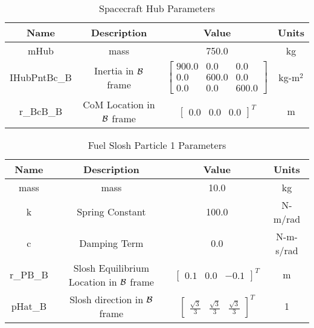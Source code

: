 \begin{table}[htbp]
	\caption{Spacecraft Hub Parameters}
	\label{tab:hub}
	\centering \fontsize{10}{10}\selectfont
	\begin{tabular}{| c | c | c | c |} %
		\hline
		\textbf{Name}  & \textbf{Description}  & \textbf{Value} & \textbf{Units} \\
		\hline
		mHub  & mass & 750.0 & kg \\
		\hline
		IHubPntBc\_B & Inertia in $\cal{B}$ frame & $\begin{bmatrix}
		900.0 & 0.0 & 0.0\\
		0.0 & 600.0 & 0.0\\
		0.0 & 0.0 & 600.0
		\end{bmatrix}$ & kg-m$^2$ \\
		\hline
		r\_BcB\_B & CoM Location in $\cal{B}$ frame & $\begin{bmatrix}
		0.0 & 0.0 & 0.0 \end{bmatrix}^T$ & m \\
		\hline
	\end{tabular}
\end{table}

\begin{table}[htbp]
	\caption{Fuel Slosh Particle 1 Parameters}
	\label{tab:slosh1}
	\centering \fontsize{10}{10}\selectfont
	\begin{tabular}{| c | c | c | c |} %
		\hline
		\textbf{Name}  & \textbf{Description}  & \textbf{Value} & \textbf{Units} \\
		\hline
		mass  & mass & 10.0 & kg \\
		\hline
		k & Spring Constant & 100.0 & N-m/rad \\
		\hline
		c & Damping Term & 0.0 & N-m-s/rad \\
		\hline
		r\_PB\_B & Slosh Equilibrium Location in $\cal{B}$ frame & $\begin{bmatrix}
		0.1 & 0.0 & -0.1 \end{bmatrix}^T$ & m \\
		\hline
		pHat\_B & Slosh direction in $\cal{B}$ frame & $\begin{bmatrix}
		\frac{\sqrt{3}}{3} & \frac{\sqrt{3}}{3} & \frac{\sqrt{3}}{3} \end{bmatrix}^T$ & 1 \\
		\hline
	\end{tabular}
\end{table}

